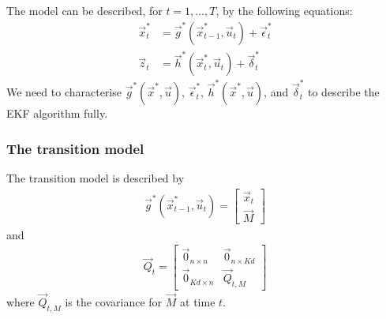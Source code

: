 The model can be described, for $t = 1, \dotsc, T$, by the following equations:
\begin{align}
	\vec x_t^\ast 	&= \vec g^\ast(\vec x_{t - 1}^\ast, \vec u_t) + \vec \epsilon_t^\ast \\
	\vec z_t 		&= \vec h^\ast(\vec x_t^\ast, \vec u_t) + \vec \delta_t^\ast
\end{align}
We need to characterise $\vec g^\ast(\vec x^\ast, \vec u)$, $\vec \epsilon_t^\ast$, $\vec h^\ast(\vec x^\ast, \vec u)$, and $\vec \delta_t^\ast$ to describe the EKF algorithm fully.

\subsubsection{The transition model}
The transition model is described by
\begin{align}
	\vec g^\ast(\vec x^\ast_{t - 1}, \vec u_t) = 
		\begin{bmatrix}
			\vec x_t \\
			\vec M
		\end{bmatrix}
\end{align}
and
\begin{align}
	\vec Q_t = 
		\begin{bmatrix}
			\vec 0_{n \times n}		& \vec 0_{n \times Kd} \\
			\vec 0_{Kd \times n}	& \vec Q_{t, M}
		\end{bmatrix}
\end{align}
where $\vec Q_{t, M}$ is the covariance for $\vec M$ at time $t$.

